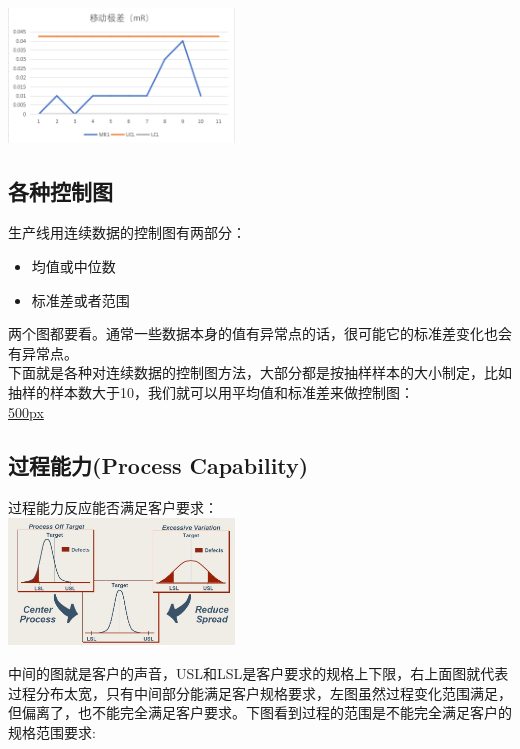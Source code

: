 \includegraphics[width=6cm]{微信截图_20210927084434.png}

\hypertarget{ux5404ux79cdux63a7ux5236ux56fe}{%
\subsection{各种控制图}\label{ux5404ux79cdux63a7ux5236ux56fe}}

生产线用连续数据的控制图有两部分：

\begin{itemize}
\tightlist
\item
  均值或中位数
\item
  标准差或者范围
\end{itemize}

两个图都要看。通常一些数据本身的值有异常点的话，很可能它的标准差变化也会有异常点。\\
下面就是各种对连续数据的控制图方法，大部分都是按抽样样本的大小制定，比如抽样的样本数大于10，我们就可以用平均值和标准差来做控制图：\\
\href{文件:控制图01.png}{500px}

\hypertarget{ux8fc7ux7a0bux80fdux529bprocess-capability-1}{%
\subsection{过程能力(Process
Capability)}\label{ux8fc7ux7a0bux80fdux529bprocess-capability-1}}

过程能力反应能否满足客户要求：\\

\includegraphics[width=6cm]{DAD_p9.jpg}

中间的图就是客户的声音，USL和LSL是客户要求的规格上下限，右上面图就代表过程分布太宽，只有中间部分能满足客户规格要求，左图虽然过程变化范围满足，但偏离了，也不能完全满足客户要求。下图看到过程的范围是不能完全满足客户的规格范围要求:\\

